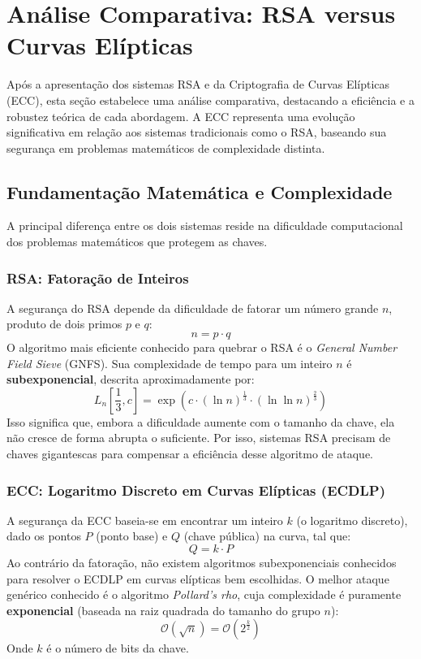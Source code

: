 \documentclass{article}
\theoremstyle{definicao_estilo}
\begin{document}

\section{Análise Comparativa: RSA versus Curvas Elípticas}
Após a apresentação dos sistemas RSA e da Criptografia de Curvas Elípticas (ECC), esta seção estabelece uma análise comparativa, destacando a eficiência e a robustez teórica de cada abordagem. A ECC representa uma evolução significativa em relação aos sistemas tradicionais como o RSA, baseando sua segurança em problemas matemáticos de complexidade distinta.

\subsection{Fundamentação Matemática e Complexidade}
A principal diferença entre os dois sistemas reside na dificuldade computacional dos problemas matemáticos que protegem as chaves.

\subsubsection{RSA: Fatoração de Inteiros}
A segurança do RSA depende da dificuldade de fatorar um número grande $n$, produto de dois primos $p$ e $q$:
\begin{equation}
n = p \cdot q
\end{equation}
O algoritmo mais eficiente conhecido para quebrar o RSA é o \textit{General Number Field Sieve} (GNFS). Sua complexidade de tempo para um inteiro $n$ é \textbf{subexponencial}, descrita aproximadamente por:
\begin{equation}
 L_n\left[\frac{1}{3}, c\right] = \exp\left( c \cdot (\ln n)^{\frac{1}{3}} \cdot (\ln \ln n)^{\frac{2}{3}} \right)
\end{equation}
Isso significa que, embora a dificuldade aumente com o tamanho da chave, ela não cresce de forma abrupta o suficiente. Por isso, sistemas RSA precisam de chaves gigantescas para compensar a eficiência desse algoritmo de ataque.

\subsubsection{ECC: Logaritmo Discreto em Curvas Elípticas (ECDLP)}
A segurança da ECC baseia-se em encontrar um inteiro $k$ (o logaritmo discreto), dado os pontos $P$ (ponto base) e $Q$ (chave pública) na curva, tal que:
\begin{equation}
 Q = k \cdot P
\end{equation}
Ao contrário da fatoração, não existem algoritmos subexponenciais conhecidos para resolver o ECDLP em curvas elípticas bem escolhidas. O melhor ataque genérico conhecido é o algoritmo \textit{Pollard's rho}, cuja complexidade é puramente \textbf{exponencial} (baseada na raiz quadrada do tamanho do grupo $n$):
\begin{equation}
\mathcal{O}(\sqrt{n}) = \mathcal{O}(2^{\frac{k}{2}})
\end{equation}
Onde $k$ é o número de bits da chave.
\end{document}
